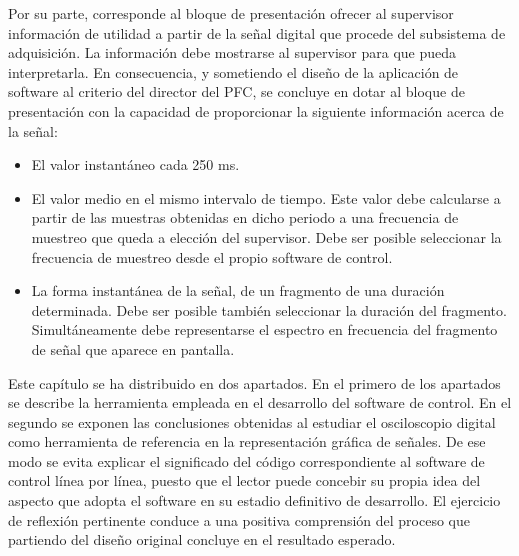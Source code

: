 Por su parte, corresponde al bloque de presentación ofrecer al supervisor
información de utilidad a partir de la señal digital que procede del
subsistema de adquisición. La información debe mostrarse al supervisor para
que pueda interpretarla. En consecuencia, y sometiendo el diseño de la
aplicación de software al criterio del director del PFC, se concluye en
dotar al bloque de presentación con la capacidad de proporcionar la
siguiente información acerca de la señal:

\begin{itemize}
    \item El valor instantáneo cada 250 ms.
    \item El valor medio en el mismo intervalo de tiempo. Este valor debe
	calcularse a partir de las muestras obtenidas en dicho periodo a
	una frecuencia de muestreo que queda a elección del supervisor.
	Debe ser posible seleccionar la frecuencia de muestreo desde el
	propio software de control.
    \item La forma instantánea de la señal, de un fragmento de una duración
	determinada. Debe ser posible también seleccionar la duración del
	fragmento. Simultáneamente debe representarse el espectro en
	frecuencia del fragmento de señal que aparece en pantalla.
\end{itemize}

Este capítulo se ha distribuido en dos apartados. En el primero de los
apartados se describe la herramienta empleada en el desarrollo del software
de control. En el segundo se exponen las conclusiones obtenidas al estudiar
el osciloscopio digital como herramienta de referencia en la representación
gráfica de señales. De ese modo se evita explicar el significado del código
correspondiente al software de control línea por línea, puesto que el
lector puede concebir su propia idea del aspecto que adopta el software en
su estadio definitivo de desarrollo. El ejercicio de reflexión pertinente
conduce a una positiva comprensión del proceso que partiendo del diseño
original concluye en el resultado esperado.

%
%

